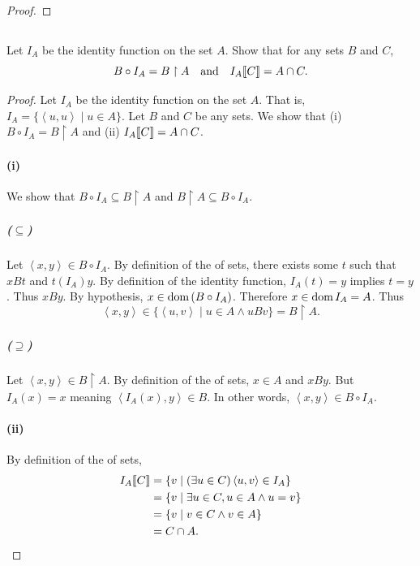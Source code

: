\documentclass{report}
\begin{document}
\begin{proof}
\end{proof}

\subsection{}%
\label{sub:exercise-3.23}

Let $I_A$ be the identity function on the set $A$.
Show that for any sets $B$ and $C$,
  $$B \circ I_A = B \restriction A \quad\text{and}\quad
    I_A\!\left\llbracket C\right\rrbracket = A \cap C.$$

\begin{proof}

  Let $I_A$ be the identity function on the set $A$.
  That is, $I_A = \{\left< u, u \right> \mid u \in A\}$.
  Let $B$ and $C$ be any sets.
  We show that (i) $B \circ I_A = B \restriction A$ and (ii)
    $I_A\!\left\llbracket C\right\rrbracket = A \cap C$.

  \paragraph{(i)}%

    We show that $B \circ I_A \subseteq B \restriction A$ and
      $B \restriction A \subseteq B \circ I_A$.

    \subparagraph{($\subseteq$)}%

      Let $\left< x, y \right> \in B \circ I_A$.
      By definition of the  of sets,
        there exists some $t$ such that $xBt$ and $t(I_A)y$.
      By definition of the identity function, $I_A(t) = y$ implies $t = y$.
      Thus $xBy$.
      By hypothesis, $x \in \mathop{\text{dom}}{(B \circ I_A)}$.
      Therefore $x \in \mathop{\text{dom}}{I_A} = A$.
      Thus
        $$\left< x, y \right>
            \in \{\left< u, v \right> \mid u \in A \land uBv\}
            = B \restriction A.$$

    \subparagraph{($\supseteq$)}%

      Let $\left< x, y \right> \in B \restriction A$.
      By definition of the  of sets,
        $x \in A$ and $xBy$.
      But $I_A(x) = x$ meaning $\left< I_A(x), y \right> \in B$.
      In other words, $\left< x, y \right> \in B \circ I_A$.

  \paragraph{(ii)}%

    By definition of the  of sets,
      \begin{align*}
        I_A\!\left\llbracket C\right\rrbracket
          & = \{v \mid (\exists u \in C) \left< u, v \right> \in I_A\} \\
          & = \{v \mid \exists u \in C, u \in A \land u = v\} \\
          & = \{v \mid v \in C \land v \in A\} \\
          & = C \cap A.
      \end{align*}

\end{proof}
\end{document}
